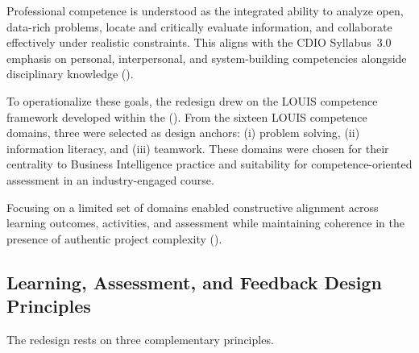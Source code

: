 Professional competence is understood as the integrated ability to analyze open, data-rich problems, locate and critically evaluate information, and collaborate effectively under realistic constraints. This aligns with the CDIO Syllabus~3.0 emphasis on personal, interpersonal, and system-building competencies alongside disciplinary knowledge (\cite{CDIOSyllabus3}).

To operationalize these goals, the redesign drew on the LOUIS competence framework developed within the \citeauthor{auroraLOUIS} (\citeyear{auroraLOUIS}). From the sixteen LOUIS competence domains, three were selected as design anchors: (i) problem solving, (ii) information literacy, and (iii) teamwork. These domains were chosen for their centrality to Business Intelligence practice and suitability for competence-oriented assessment in an industry-engaged course.

Focusing on a limited set of domains enabled constructive alignment across learning outcomes, activities, and assessment while maintaining coherence in the presence of authentic project complexity (\cite{biggs_constructive}).



\subsection{Learning, Assessment, and Feedback Design Principles}

The redesign rests on three complementary principles.

